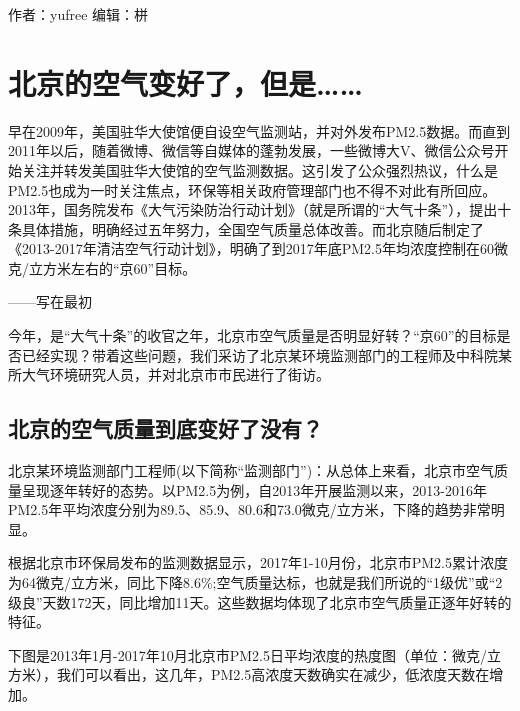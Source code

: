 \documentclass[
]{book}
\begin{document}
作者：yufree
编辑：栟

\hypertarget{ux5317ux4eacux7684ux7a7aux6c14ux53d8ux597dux4e86ux4f46ux662f}{%
\section{北京的空气变好了，但是\ldots\ldots{}}\label{ux5317ux4eacux7684ux7a7aux6c14ux53d8ux597dux4e86ux4f46ux662f}}

早在2009年，美国驻华大使馆便自设空气监测站，并对外发布PM2.5数据。而直到2011年以后，随着微博、微信等自媒体的蓬勃发展，一些微博大V、微信公众号开始关注并转发美国驻华大使馆的空气监测数据。这引发了公众强烈热议，什么是PM2.5也成为一时关注焦点，环保等相关政府管理部门也不得不对此有所回应。2013年，国务院发布《大气污染防治行动计划》（就是所谓的``大气十条''），提出十条具体措施，明确经过五年努力，全国空气质量总体改善。而北京随后制定了《2013-2017年清洁空气行动计划》，明确了到2017年底PM2.5年均浓度控制在60微克/立方米左右的``京60''目标。

------写在最初

今年，是``大气十条''的收官之年，北京市空气质量是否明显好转？``京60''的目标是否已经实现？带着这些问题，我们采访了北京某环境监测部门的工程师及中科院某所大气环境研究人员，并对北京市市民进行了街访。

\hypertarget{ux5317ux4eacux7684ux7a7aux6c14ux8d28ux91cfux5230ux5e95ux53d8ux597dux4e86ux6ca1ux6709}{%
\subsection{北京的空气质量到底变好了没有？}\label{ux5317ux4eacux7684ux7a7aux6c14ux8d28ux91cfux5230ux5e95ux53d8ux597dux4e86ux6ca1ux6709}}

北京某环境监测部门工程师(以下简称``监测部门'')：从总体上来看，北京市空气质量呈现逐年转好的态势。以PM2.5为例，自2013年开展监测以来，2013-2016年PM2.5年平均浓度分别为89.5、85.9、80.6和73.0微克/立方米，下降的趋势非常明显。

根据北京市环保局发布的监测数据显示，2017年1-10月份，北京市PM2.5累计浓度为64微克/立方米，同比下降8.6\%;空气质量达标，也就是我们所说的``1级优''或``2级良''天数172天，同比增加11天。这些数据均体现了北京市空气质量正逐年好转的特征。

下图是2013年1月-2017年10月北京市PM2.5日平均浓度的热度图（单位：微克/立方米），我们可以看出，这几年，PM2.5高浓度天数确实在减少，低浓度天数在增加。
\end{document}

